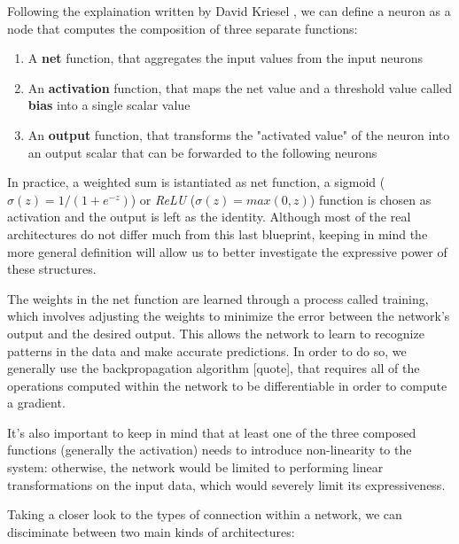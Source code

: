\documentclass{article}
\begin{document}
Following the explaination written by David Kriesel \cite{KRI07}, we can define a neuron as a node that computes the composition of three separate functions:

\begin{enumerate}
    \item A \textbf{net} function, that aggregates the input values from the input neurons
    \item An \textbf{activation} function, that maps the net value and a threshold value called \textbf{bias} into a single scalar value
    \item An \textbf{output} function, that transforms the "activated value" of the neuron into an output scalar that can be forwarded to the following neurons
\end{enumerate}

In practice, a weighted sum is istantiated as net function, a sigmoid ($\sigma(z)=1/(1+e^{-z})$) or \textit{ReLU} ($\sigma(z) = max(0,z)$) function is chosen as activation and the output is left as the identity. Although most of the real architectures do not differ much from this last blueprint, keeping in mind the more general definition will allow us to better investigate the expressive power of these structures.

The weights in the net function are learned through a process called training, which involves adjusting the weights to minimize the error between the network's output and the desired output. This allows the network to learn to recognize patterns in the data and make accurate predictions. In order to do so, we generally use the backpropagation algorithm [quote], that requires all of the operations computed within the network to be differentiable in order to compute a gradient.

It's also important to keep in mind that at least one of the three composed functions (generally the activation) needs to introduce non-linearity to the system: otherwise, the network would be limited to performing linear transformations on the input data, which would severely limit its expressiveness.

Taking a closer look to the types of connection within a network, we can disciminate between two main kinds of architectures:
\end{document}
